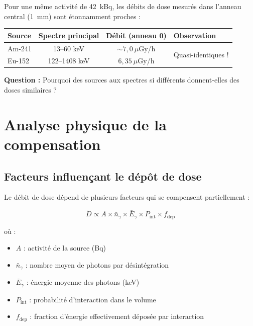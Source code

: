 \documentclass[11pt,a4paper]{article}
\begin{document}
Pour une même activité de 42~kBq, les débits de dose mesurés dans l'anneau central (1~mm) sont étonnamment proches :

\begin{center}
\begin{tabular}{lccl}
\toprule
\rowcolor{headerblue!20}
\textbf{Source} & \textbf{Spectre principal} & \textbf{Débit (anneau 0)} & \textbf{Observation} \\
\midrule
Am-241 & 13--60 keV & $\sim 7{,}0~\mu$Gy/h & \multirow{2}{*}{Quasi-identiques !} \\
\rowcolor{lightgray}
Eu-152 & 122--1408 keV & $6{,}35~\mu$Gy/h & \\
\bottomrule
\end{tabular}
\end{center}

\textbf{Question :} Pourquoi des sources aux spectres si différents donnent-elles des doses similaires ?

\section{Analyse physique de la compensation}

\subsection{Facteurs influençant le dépôt de dose}

Le débit de dose dépend de plusieurs facteurs qui se compensent partiellement :

\begin{equation}
\dot{D} \propto A \times \bar{n}_\gamma \times \bar{E}_\gamma \times P_{\text{int}} \times f_{\text{dep}}
\end{equation}

où :
\begin{itemize}[noitemsep]
    \item $A$ : activité de la source (Bq)
    \item $\bar{n}_\gamma$ : nombre moyen de photons par désintégration
    \item $\bar{E}_\gamma$ : énergie moyenne des photons (keV)
    \item $P_{\text{int}}$ : probabilité d'interaction dans le volume
    \item $f_{\text{dep}}$ : fraction d'énergie effectivement déposée par interaction
\end{itemize}
\end{document}
